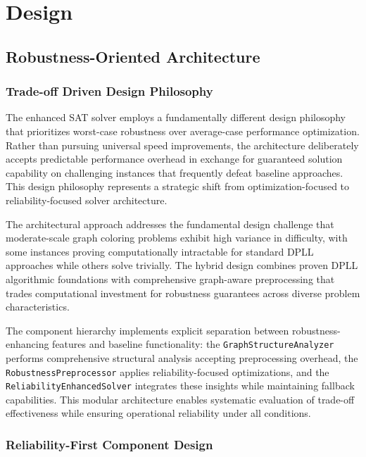 \section{Design}

\subsection{Robustness-Oriented Architecture}

\subsubsection{Trade-off Driven Design Philosophy}

The enhanced SAT solver employs a fundamentally different design philosophy that prioritizes worst-case robustness over average-case performance optimization. Rather than pursuing universal speed improvements, the architecture deliberately accepts predictable performance overhead in exchange for guaranteed solution capability on challenging instances that frequently defeat baseline approaches. This design philosophy represents a strategic shift from optimization-focused to reliability-focused solver architecture.

The architectural approach addresses the fundamental design challenge that moderate-scale graph coloring problems exhibit high variance in difficulty, with some instances proving computationally intractable for standard DPLL approaches while others solve trivially. The hybrid design combines proven DPLL algorithmic foundations with comprehensive graph-aware preprocessing that trades computational investment for robustness guarantees across diverse problem characteristics.

The component hierarchy implements explicit separation between robustness-enhan\-cing features and baseline functionality: the \texttt{GraphStructureAnalyzer} performs comprehensive structural analysis accepting preprocessing overhead, the \texttt{Robustness\-Pre\-processor} applies reliability-focused optimizations, and the \texttt{Reliability\-Enhanced\-Solver} integrates these insights while maintaining fallback capabilities. This modular architecture enables systematic evaluation of trade-off effectiveness while ensuring operational reliability under all conditions.

\subsubsection{Reliability-First Component Design}

